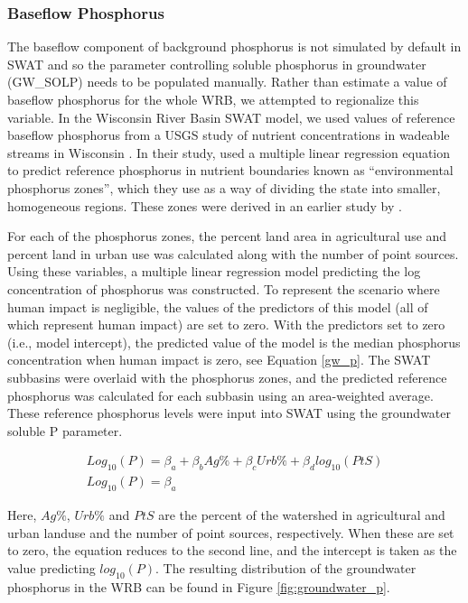 \subsubsection{Baseflow Phosphorus}\label{sec:gwp}
	The baseflow component of background phosphorus is not simulated by default in SWAT and so the parameter controlling soluble phosphorus in groundwater (GW\_SOLP) needs to be populated manually. Rather than estimate a value of baseflow phosphorus for the whole WRB, we attempted to regionalize this variable. In the Wisconsin River Basin SWAT model, we used values of reference baseflow phosphorus from a USGS study of nutrient concentrations in wadeable streams in Wisconsin \citep{robertson_wadeable_2006}. In their study, \citet{robertson_wadeable_2006} used a multiple linear regression equation to predict reference phosphorus in nutrient boundaries known as ``environmental phosphorus zones'', which they use as a way of dividing the state into smaller, homogeneous regions. These zones were derived in an earlier study by \citet{robertson_phosphoruszones_2006}.

	
	For each of the phosphorus zones, the percent land area in agricultural use and percent land in urban use was calculated along with the number of point sources. Using these variables, a multiple linear regression model predicting the log concentration of phosphorus was constructed. To represent the scenario where human impact is negligible, the values of the predictors of this model (all of which represent human impact) are set to zero. With the predictors set to zero (i.e., model intercept), the predicted value of the model is the median phosphorus concentration when human impact is zero, see Equation \ref{gw_p}. The SWAT subbasins were overlaid with the phosphorus zones, and the predicted reference phosphorus was calculated for each subbasin using an area-weighted average. These reference phosphorus levels were input into SWAT using the groundwater soluble P parameter.
	
	
	\begin{eqnarray}
	Log_{10}(P) = \beta_a + \beta_bAg\% + \beta_cUrb\% + \beta_dlog_{10}(PtS)      \\
	
	Log_{10}(P) = \beta_a 
	\end{eqnarray}
		
	Here, $Ag\%$, $Urb\%$ and $PtS$ are the percent of the watershed in agricultural and urban landuse and the number of point sources, respectively. When these are set to zero, the equation reduces to the second line, and the intercept is taken as the value predicting $log_{10}(P)$. The resulting distribution of the groundwater phosphorus in the WRB can be found in Figure \ref{fig:groundwater_p}.
	
